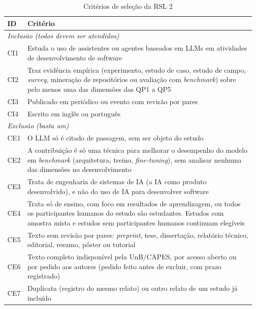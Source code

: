 \begin{table}[htbp]
	\centering
	\caption{Critérios de seleção da RSL 2}
	\label{tab:criterios-rsl2}
	\small
	\begin{tabular}{p{1cm}p{13.4cm}}
		\hline
		\textbf{ID} & \textbf{Critério} \\
		\hline
		\multicolumn{2}{l}{\textit{Inclusão (todos devem ser atendidos)}} \\
		CI1 & Estuda o uso de assistentes ou agentes baseados em LLMs em
		atividades de desenvolvimento de software \\
		CI2 & Traz evidência empírica (experimento, estudo de caso, estudo de
		campo, \textit{survey}, mineração de repositórios ou avaliação com
		\textit{benchmark}) sobre pelo menos uma das dimensões das QP1 a QP5
		\\
		CI3 & Publicado em periódico ou evento com revisão por pares \\
		CI4 & Escrito em inglês ou português \\
		\hline
		\multicolumn{2}{l}{\textit{Exclusão (basta um)}} \\
		CE1 & O LLM só é citado de passagem, sem ser objeto do estudo \\
		CE2 & A contribuição é só uma técnica para melhorar o desempenho do
		modelo em \textit{benchmark} (arquitetura, treino,
		\textit{fine-tuning}), sem analisar nenhuma das dimensões no
		desenvolvimento \\
		CE3 & Trata de engenharia de sistemas de IA (a IA como produto
		desenvolvido), e não do uso de IA para desenvolver software \\
		CE4 & Trata só de ensino, com foco em resultados de aprendizagem, ou
		todos os participantes humanos do estudo são estudantes. Estudos com
		amostra mista e estudos sem participantes humanos continuam elegíveis
		\\
		CE5 & Texto sem revisão por pares: \textit{preprint}, tese,
		dissertação, relatório técnico, editorial, resumo, pôster ou tutorial
		\\
		CE6 & Texto completo indisponível pela UnB/CAPES, por acesso aberto ou
		por pedido aos autores (pedido feito antes de excluir, com prazo
		registrado) \\
		CE7 & Duplicata (registro do mesmo relato) ou outro relato de um
		estudo já incluído \\
		\hline
	\end{tabular}
\end{table}

